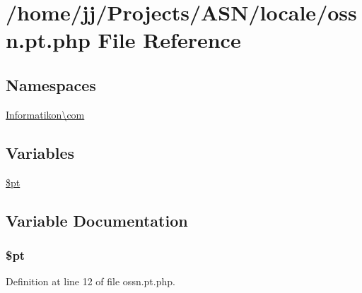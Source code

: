 \hypertarget{locale_2ossn_8pt_8php}{}\section{/home/jj/\+Projects/\+A\+S\+N/locale/ossn.pt.\+php File Reference}
\label{locale_2ossn_8pt_8php}
\subsection*{Namespaces}
\begin{DoxyCompactItemize}
\item 
 \hyperlink{namespace_informatikon_1_1com}{Informatikon\textbackslash{}com}
\end{DoxyCompactItemize}
\subsection*{Variables}
\begin{DoxyCompactItemize}
\item 
\hyperlink{locale_2ossn_8pt_8php_a62c150775a7a00e8663463c638016cad}{\$pt}
\end{DoxyCompactItemize}


\subsection{Variable Documentation}
\subsubsection[{\texorpdfstring{\$pt}{$pt}}]{\setlength{\rightskip}{0pt plus 5cm}\$pt}\hypertarget{locale_2ossn_8pt_8php_a62c150775a7a00e8663463c638016cad}{}\label{locale_2ossn_8pt_8php_a62c150775a7a00e8663463c638016cad}


Definition at line 12 of file ossn.\+pt.\+php.

